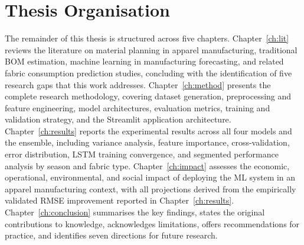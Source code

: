 \section{Thesis Organisation}
The remainder of this thesis is structured across five chapters. Chapter~\ref{ch:lit} reviews the literature on material planning in apparel manufacturing, traditional BOM estimation, machine learning in manufacturing forecasting, and related fabric consumption prediction studies, concluding with the identification of five research gaps that this work addresses. Chapter~\ref{ch:method} presents the complete research methodology, covering dataset generation, preprocessing and feature engineering, model architectures, evaluation metrics, training and validation strategy, and the Streamlit application architecture. Chapter~\ref{ch:results} reports the experimental results across all four models and the ensemble, including variance analysis, feature importance, cross-validation, error distribution, LSTM training convergence, and segmented performance analysis by season and fabric type. Chapter~\ref{ch:impact} assesses the economic, operational, environmental, and social impact of deploying the ML system in an apparel manufacturing context, with all projections derived from the empirically validated RMSE improvement reported in Chapter~\ref{ch:results}. Chapter~\ref{ch:conclusion} summarises the key findings, states the original contributions to knowledge, acknowledges limitations, offers recommendations for practice, and identifies seven directions for future research.
